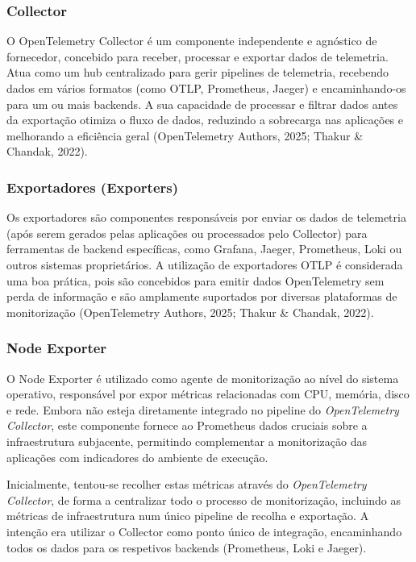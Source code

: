 \subsubsection{Collector}
O OpenTelemetry Collector é um componente independente e agnóstico de fornecedor, concebido para receber, processar e exportar dados de telemetria. Atua como um hub centralizado para gerir pipelines de telemetria, recebendo dados em vários formatos (como OTLP, Prometheus, Jaeger) e encaminhando-os para um ou mais backends. A sua capacidade de processar e filtrar dados antes da exportação otimiza o fluxo de dados, reduzindo a sobrecarga nas aplicações e melhorando a eficiência geral (OpenTelemetry Authors, 2025; Thakur \& Chandak, 2022).

\subsubsection{Exportadores (Exporters)}
Os exportadores são componentes responsáveis por enviar os dados de telemetria (após serem gerados pelas aplicações ou processados pelo Collector) para ferramentas de backend específicas, como Grafana, Jaeger, Prometheus, Loki ou outros sistemas proprietários. A utilização de exportadores OTLP é considerada uma boa prática, pois são concebidos para emitir dados OpenTelemetry sem perda de informação e são amplamente suportados por diversas plataformas de monitorização (OpenTelemetry Authors, 2025; Thakur \& Chandak, 2022).

\subsubsection{Node Exporter}
O Node Exporter é utilizado como agente de monitorização ao nível do sistema operativo, responsável por expor métricas relacionadas com CPU, memória, disco e rede. Embora não esteja diretamente integrado no pipeline do \textit{OpenTelemetry Collector}, este componente fornece ao Prometheus dados cruciais sobre a infraestrutura subjacente, permitindo complementar a monitorização das aplicações com indicadores do ambiente de execução.

Inicialmente, tentou-se recolher estas métricas através do \textit{OpenTelemetry Collector}, de forma a centralizar todo o processo de monitorização, incluindo as métricas de infraestrutura num único pipeline de recolha e exportação. A intenção era utilizar o Collector como ponto único de integração, encaminhando todos os dados para os respetivos backends (Prometheus, Loki e Jaeger).

